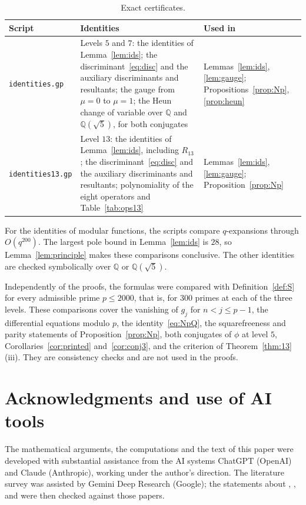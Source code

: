 \documentclass[11pt,a4paper]{article}
\theoremstyle{definition}
\theoremstyle{remark}
\newcommand{\Q}{\mathbb{Q}}
\numberwithin{equation}{section}
\begin{document}
\begin{table}[htbp]
\centering\small\renewcommand{\arraystretch}{1.2}
\begin{tabular}{@{}>{\raggedright\arraybackslash}p{}>{\raggedright\arraybackslash}p{}>{\raggedright\arraybackslash}p{}@{}}
\toprule
Script & Identities & Used in\\
\midrule
\texttt{identities.gp} & Levels $5$ and $7$: the identities of
Lemma~\ref{lem:ids}; the discriminant~\eqref{eq:disc} and the auxiliary
discriminants and resultants; the gauge from $\mu=0$ to $\mu=1$; the Heun
change of variable over $\Q$ and $\Q(\sqrt5)$, for both conjugates &
Lemmas~\ref{lem:ids}, \ref{lem:gauge}; Propositions~\ref{prop:Np},
\ref{prop:heun}\\
\texttt{identities13.gp} & Level $13$: the identities of
Lemma~\ref{lem:ids}, including $R_{13}$; the discriminant~\eqref{eq:disc} and
the auxiliary discriminants and resultants; polynomiality of the eight
operators and Table~\ref{tab:ops13} &
Lemmas~\ref{lem:ids}, \ref{lem:gauge}; Proposition~\ref{prop:Np}\\
\bottomrule
\end{tabular}
\caption{Exact certificates.}
\label{tab:cert}
\end{table}

For the identities of modular functions, the scripts compare $q$-expansions
through $O(q^{200})$. The largest pole bound in Lemma~\ref{lem:ids} is $28$,
so Lemma~\ref{lem:principle} makes these comparisons conclusive. The other
identities are checked symbolically over $\Q$ or $\Q(\sqrt5)$.

Independently of the proofs, the formulas were compared with
Definition~\ref{def:S} for every admissible prime $p\le2000$, that is, for
$300$ primes at each of the three levels. These comparisons cover the
vanishing of $g_j$ for $n<j\le p-1$, the differential equations modulo $p$,
the identity~\eqref{eq:NpQ}, the squarefreeness and parity statements of
Proposition~\ref{prop:Np}, both conjugates of $\phi$ at level $5$,
Corollaries~\ref{cor:printed} and~\ref{cor:conj3}, and the criterion of
Theorem~\ref{thm:13}(iii). They are consistency checks and are not used in the
proofs.

\section*{Acknowledgments and use of AI tools}
The mathematical arguments, the computations and the text of this paper were
developed with substantial assistance from the AI systems ChatGPT (OpenAI) and
Claude (Anthropic), working under the author's direction. The literature
survey was assisted by Gemini Deep Research (Google); the statements about
\cite{Sakai14}, \cite{Bogo}, \cite{BL1} and \cite{Aricheta} were then checked
against those papers.
\end{document}
